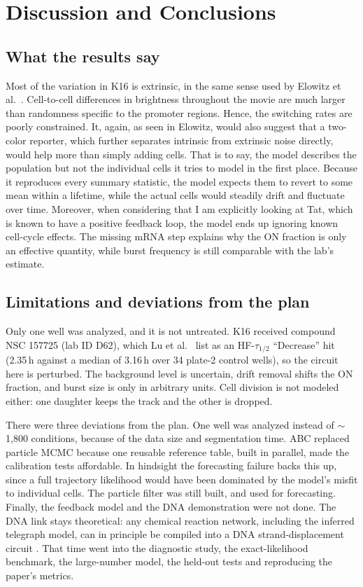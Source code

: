 \chapter{Discussion and Conclusions}\label{ch:discussion}

\section{What the results say}\label{sec:disc-findings}

Most of the variation in K16 is extrinsic, in the same sense used by Elowitz et al.\ \cite{elowitz2002}. Cell-to-cell differences in brightness throughout the movie are much larger than randomness specific to the promoter regions. Hence, the switching rates are poorly constrained. It, again, as seen in Elowitz, would also suggest that a two-color reporter, which further separates intrinsic from extrinsic noise directly, would help more than simply adding cells. That is to say, the model describes the population but not the individual cells it tries to model in the first place. Because it reproduces every summary statistic, the model expects them to revert to some mean within a lifetime, while the actual cells would steadily drift and fluctuate over time. Moreover, when considering that I am explicitly looking at Tat, which is known to have a positive feedback loop, the model ends up ignoring known cell-cycle effects. The missing mRNA step explains why the ON fraction is only an effective quantity, while burst frequency is still comparable with the lab's estimate.

\section{Limitations and deviations from the plan}\label{sec:disc-deviations}

Only one well was analyzed, and it is not untreated. K16 received compound NSC 157725 (lab ID D62), which Lu et al.\ \cite{lu2021} list as an HF-$\tau_{1/2}$ ``Decrease'' hit (2.35\,h against a median of 3.16\,h over 34 plate-2 control wells), so the circuit here is perturbed. The background level is uncertain, drift removal shifts the ON fraction, and burst size is only in arbitrary units. Cell division is not modeled either: one daughter keeps the track and the other is dropped.

There were three deviations from the plan. One well was analyzed instead of $\sim$1,800 conditions, because of the data size and segmentation time. ABC replaced particle MCMC because one reusable reference table, built in parallel, made the calibration tests affordable. In hindsight the forecasting failure backs this up, since a full trajectory likelihood would have been dominated by the model's misfit to individual cells. The particle filter was still built, and used for forecasting. Finally, the feedback model and the DNA demonstration were not done. The DNA link stays theoretical: any chemical reaction network, including the inferred telegraph model, can in principle be compiled into a DNA strand-displacement circuit \cite{soloveichik2010}. That time went into the diagnostic study, the exact-likelihood benchmark, the large-number model, the held-out tests and reproducing the paper's metrics.

